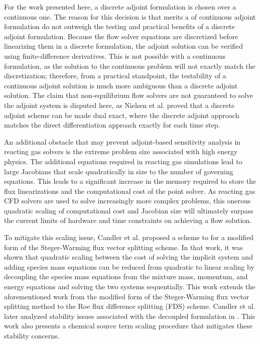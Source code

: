 For the work presented here, a discrete adjoint formulation is chosen over a
continuous one.  The reason for this decision is that merits a of continuous
adjoint formulation do not outweigh the testing and practical benefits of a
discrete adjoint formulation.  Because the flow solver equations are discretized
before linearizing them in a discrete formulation, the adjoint solution can be
verified using finite-difference derivatives.  This is not possible with a
continuous formulation, as the solution to the continuous problem will not
exactly match the discretization; therefore, from a practical standpoint, the
testability of a continuous adjoint solution is much more ambiguous than a
discrete adjoint solution.  The claim that non-equilibrium flow solvers are not
guaranteed to solve the adjoint system is disputed here, as Nielsen et
al.\cite{nielsen2004implicit} proved that a discrete adjoint scheme can be made
dual exact, where the discrete adjoint approach matches the direct
differentiation approach exactly for each time step.

An additional obstacle that may prevent adjoint-based sensitivity analysis in
reacting gas solvers is the extreme problem size associated with high energy
physics.  The additional equations required in reacting gas simulations lead to
large Jacobians that scale quadratically in size to the number of governing
equations.  This leads to a significant increase in the memory required to store
the flux linearizations and the computational cost of the point solver.  As
reacting gas CFD solvers are used to solve increasingly more complex problems,
this onerous quadratic scaling of computational cost and Jacobian size will
ultimately surpass the current limits of hardware and time constraints on
achieving a flow solution\cite{fischer}.

To mitigate this scaling issue, Candler et al.\cite{candler} proposed a scheme
to for a modified form of the Steger-Warming flux vector splitting
scheme\cite{MacCormack,Steger}. In that work, it was shown that quadratic
scaling between the cost of solving the implicit system and adding species mass
equations can be reduced from quadratic to linear scaling by decoupling the
species mass equations from the mixture mass, momentum, and energy equations and
solving the two systems sequentially.  This work extends the aforementioned work
from the modified form of the Steger-Warming flux vector splitting
method to the Roe flux difference splitting (FDS) scheme.  Candler et
al.\cite{candler2013analysis} later analyzed stability issues associated with
the decoupled formulation in \cite{candler}.  This work also presents a chemical
source term scaling procedure that mitigates these stability concerns.

